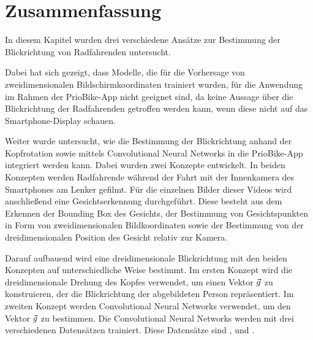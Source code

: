 \section{Zusammenfassung}

In diesem Kapitel wurden drei verschiedene Ansätze zur Bestimmung der Blickrichtung von Radfahrenden untersucht. 

Dabei hat sich gezeigt, dass Modelle, die für die Vorhersage von zweidimensionalen Bildschirmkoordinaten trainiert wurden, für die Anwendung im Rahmen der PrioBike-App nicht geeignet sind, da keine Aussage über die Blickrichtung der Radfahrenden getroffen werden kann, wenn diese nicht auf das Smartphone-Display schauen.

Weiter wurde untersucht, wie die Bestimmung der Blickrichtung anhand der Kopfrotation sowie mittels Convolutional Neural Networks in die PrioBike-App integriert werden kann. Dabei wurden zwei Konzepte entwickelt. In beiden Konzepten werden Radfahrende während der Fahrt mit der Innenkamera des Smartphones am Lenker gefilmt. Für die einzelnen Bilder dieser Videos wird anschließend eine Gesichtserkennung durchgeführt. Diese besteht aus dem Erkennen der Bounding Box des Gesichts, der Bestimmung von Gesichtspunkten in Form von zweidimensionalen Bildkoordinaten sowie der Bestimmung von der dreidimensionalen Position des Gesicht relativ zur Kamera.

Darauf aufbauend wird eine dreidimensionale Blickrichtung mit den beiden Konzepten auf unterschiedliche Weise bestimmt. Im ersten Konzept wird die dreidimensionale Drehung des Kopfes verwendet, um einen Vektor $\vec{g}$ zu konstruieren, der die Blickrichtung der abgebildeten Person repräsentiert. Im zweiten Konzept werden Convolutional Neural Networks verwendet, um den Vektor $\vec{g}$ zu bestimmen. Die Convolutional Neural Networks werden mit drei verschiedenen Datensätzen trainiert. Diese Datensätze sind \ethg \cite{paper:eth-xgaze}, \gazed \cite{paper:gaze360} und \mpii \cite{paper:mpiifacegaze}. 

